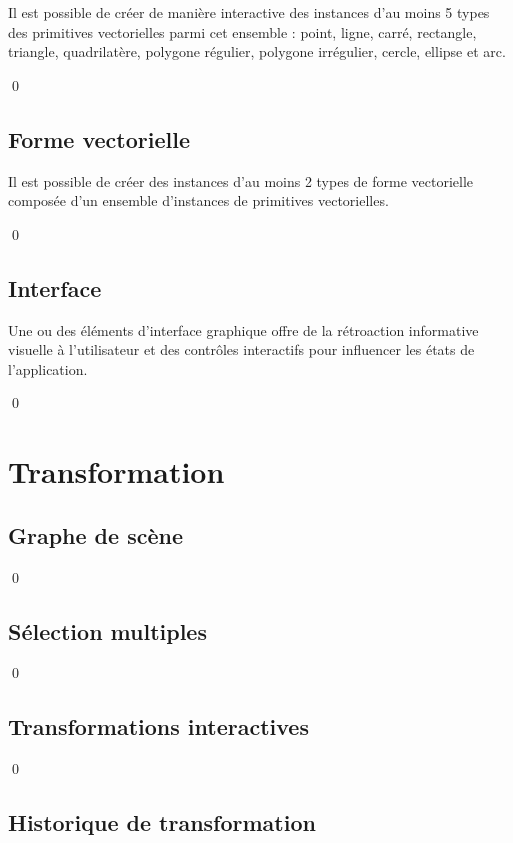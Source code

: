 \documentclass[12pt]{article}
\newcommand{\state}{\noindent}
\begin{document}
\state
Il est possible de créer de manière interactive des instances d'au moins 5 types des primitives vectorielles parmi cet ensemble : point, ligne, carré, rectangle, triangle, quadrilatère, polygone régulier, polygone irrégulier, cercle, ellipse et arc.

\qed

\subsection{Forme vectorielle}

\state
Il est possible de créer des instances d'au moins 2 types de forme vectorielle composée d'un ensemble d'instances de primitives vectorielles.

\qed

\subsection{Interface}

\state
Une ou des éléments d'interface graphique offre de la rétroaction informative visuelle à l'utilisateur et des contrôles interactifs pour influencer les états de l'application.

\qed

\pagebreak

\section{Transformation}

\subsection{Graphe de scène}

\state

\qed

\subsection{Sélection multiples}

\state

\qed

\subsection{Transformations interactives}

\state

\qed


\subsection{Historique de transformation}
\end{document}
